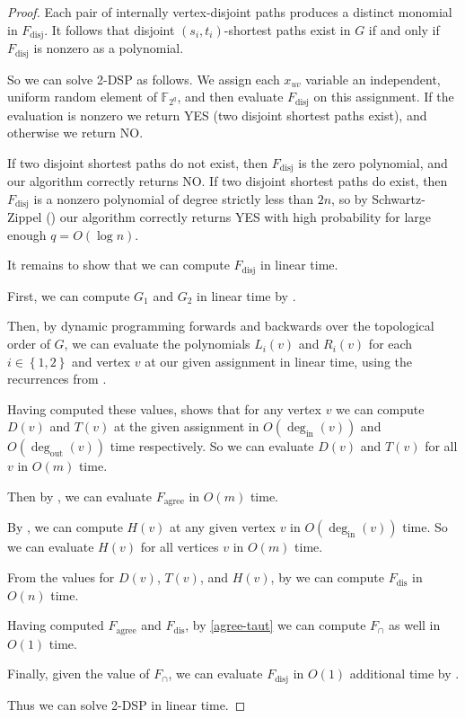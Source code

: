 \documentclass[11pt]{article}
\newcommand{\set}[1]{\left\{#1\right\}}
\DeclareMathOperator{\disj}{disj}
\newcommand{\agree}{\text{agree}}
\newcommand{\Fagree}{F_{\agree}}
\newcommand{\Frev}{F_{\text{dis}}}
\theoremstyle{definition}
\begin{document}
\twodspundir*
\begin{proof}
    Each pair of internally vertex-disjoint paths produces a distinct monomial in $F_{\disj}$.
    It follows that disjoint $(s_i,t_i)$-shortest paths exist in $G$ if and only if $F_{\disj}$ is nonzero as a polynomial.

    So we can solve \textsf{2-DSP} as follows.
    We assign each $x_{uv}$ variable an independent, uniform random element of $\mathbb{F}_{2^q}$, and then evaluate $F_{\disj}$ on this assignment.
    If the evaluation is nonzero we return YES (two disjoint shortest paths exist), and otherwise we return NO.
    
    If two disjoint shortest paths do not exist, then $F_{\disj}$ is the zero polynomial, and our algorithm correctly returns NO.
    If two disjoint shortest paths do exist, then $F_{\disj}$ is a nonzero polynomial of degree strictly less than $2n$, so by Schwartz-Zippel () our algorithm correctly returns YES with high probability for large enough $q = O(\log n)$.

    It remains to show that we can compute $F_{\disj}$ in linear time.

        First, we can compute $G_1$ and $G_2$ in linear time by .

            Then, by dynamic programming forwards and backwards over the topological order of $G$, we can evaluate the polynomials  $L_i(v)$   and $R_i(v)$ for each $i\in\set{1,2}$ and vertex $v$ at our given assignment in linear time, using the recurrences from .


    
    Having computed these values,  shows that for any vertex $v$ we can compute $D(v)$ and $T(v)$ at the given assignment in $O(\deg_{\text{in}}(v))$ and $O(\deg_{\text{out}}(v))$ time respectively.
    So we can evaluate $D(v)$ and $T(v)$ for all $v$ in $O(m)$ time.

    Then by , we can evaluate $\Fagree$ in $O(m)$ time.

    By , we can compute $H(v)$ at any given vertex $v$ in $O(\deg_{\text{in}}(v))$ time.
    So we can evaluate $H(v)$ for all vertices $v$ in $O(m)$ time.

    From the values for $D(v)$, $T(v)$, and $H(v)$, by  we can compute $\Frev$ in $O(n)$ time. 

    Having computed $\Fagree$ and $\Frev$, by \cref{agree-taut} we can compute $F_{\cap}$ as well in $O(1)$ time.

    Finally, given the value of $F_{\cap}$, we can evaluate $F_{\disj}$ in $O(1)$ additional time by .

     Thus we can solve \textsf{2-DSP} in linear time.
    \end{proof}
\end{document}
